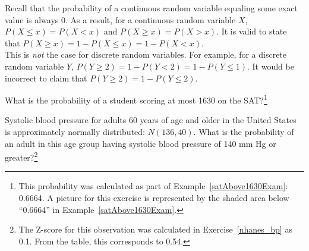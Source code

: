 \begin{tipBox}{
		Recall that the probability of a continuous random variable equaling some exact value is always 0. As a result, for a continuous random variable $X$, $P(X \leq x) = P(X < x)$ and $P(X \geq x) = P(X > x)$. It is valid to state that $P(X \geq x) = 1 - P(X \leq x) = 1 - P(X < x)$.\\
		
		This is \textit{not} the case for discrete random variables. For example, for a discrete random variable $Y$, $P(Y \geq 2) = 1 - P(Y < 2) = 1 - P(Y \leq 1)$. It would be incorrect to claim that $P(Y \geq 2) = 1 - P(Y \leq 2)$.
	}
\end{tipBox}


\begin{exercise}
What is the probability of a student scoring at most 1630 on the SAT?\footnote{This probability was calculated as part of Example~\ref{satAbove1630Exam}: 0.6664. A picture for this exercise is represented by the shaded area below ``0.6664'' in Example~\ref{satAbove1630Exam}.}
\end{exercise}

\begin{exercise}
Systolic blood pressure for adults 60 years of age and older in the United States is approximately normally distributed: $N(136, 40)$. What is the probability of an adult in this age group having systolic blood pressure of 140 mm Hg or greater?\footnote{The Z-score for this observation was calculated in Exercise~\ref{nhanes_bp} as 0.1. From the table, this corresponds to 0.54.}
\end{exercise}

